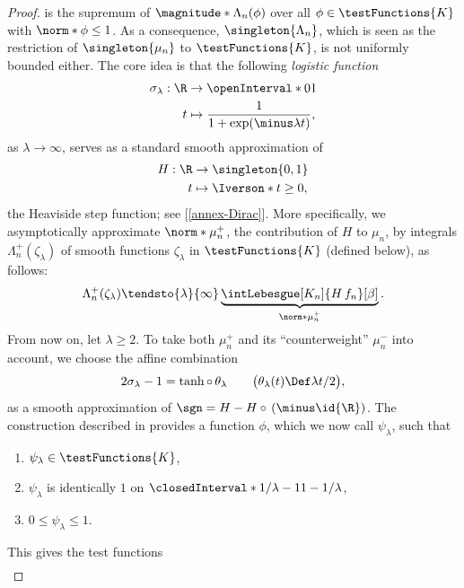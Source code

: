 \begin{proof}
is the supremum of $\magnitude*{\Lambda_n(\phi)}$ over all $\phi \in \testFunctions{K}$ with $\norm*{\phi}\leq 1$. As a %
consequence, $\singleton{\Lambda_n}$, which is seen as the restriction of $\singleton{\mu_n}$ to $\testFunctions{K}$, is not %
uniformly bounded either. The core idea is that the following \emph{logistic function} %
%
\begin{align}
  \sigma_\lambda: \R &\to \openInterval*{0}{1}\\
                    t & \mapsto \frac{1}{1+\exp(\minus\lambda t)}, \nonumber
\end{align}
%
as $\lambda \longrightarrow \infty$, serves as a standard smooth approximation of 
%
\begin{align}
  H: \R &\to \singleton{0, 1}\\
      t & \mapsto \Iverson*{t\geq 0},  \nonumber
\end{align}
%
the Heaviside step function; see [\ref{annex-Dirac}]. More specifically, we asymptotically approximate $\norm*{\mu_{n}^{+}}$, %
the contribution of $H$ to $\mu_n$, by integrals $\Lambda_{n}^{+}(\zeta_\lambda)$ of smooth functions $\zeta_\lambda$ in %
$\testFunctions{K}$ (defined below), as follows:
%
\begin{equation}\label{2.3:estimate-of-mu-n-plus}
  \Lambda_{n}^{+}(\zeta_\lambda) \tendsto{\lambda}{\infty} %
    \underbrace{\intLebesgue[K_n]{H \, f_n}[\beta]}_{\norm*{\mu_{n}^{+}}}.
\end{equation}
%
From now on, let $\lambda \geq 2$. To take both $\mu_{n}^{+}$ and its ``counterweight'' $\mu_n^-$ into account, we choose the %
affine combination 
%
\begin{equation}
  2\sigma_\lambda - 1 = \tanh \circ \, \theta_\lambda \qquad\bigl(\theta_\lambda(t) \Def \lambda t/2 \bigr), 
\end{equation}
%
as a smooth approximation of $\sgn = H - H \circ \, (\minus \id{\R})$. %
The construction described in  provides %
a function $\phi$, which we now call $\psi_\lambda$, such that
%
\begin{enumerate}[item-label=(\alph{enumi})]
  \item $\psi_\lambda \in \testFunctions{K}$, 
  \item $\psi_\lambda$ is identically $1$ on $\closedInterval*{1/\lambda - 1}{1 - 1/\lambda}$, 
  \item $0 \leq \psi_\lambda \leq 1$.
\end{enumerate}
%
This gives the test functions
%
\begin{align}\label{2.3:norm-of-lambda-n:test-functions-zeta}

\end{align}
\end{proof}
